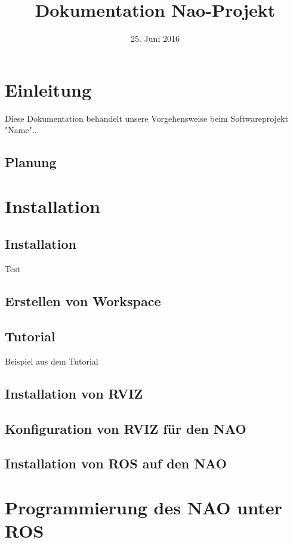 \documentclass{scrartcl}
\title{Dokumentation Nao-Projekt}
\date{25. Juni 2016}
\begin{document}
\maketitle
\tableofcontents


\section{Einleitung}

Diese Dokumentation behandelt unsere Vorgehensweise beim Softwareprojekt "Name"..

\subsection{Planung}

\section{Installation}

\subsection{Installation}
Test
\subsection{Erstellen von Workspace}
\subsection{Tutorial}
Beispiel aus dem Tutorial
\subsection{Installation von RVIZ}
\subsection{Konfiguration von RVIZ für den NAO}
\subsection{Installation von ROS auf den NAO}


\section{Programmierung des NAO unter ROS}
\end{document}
